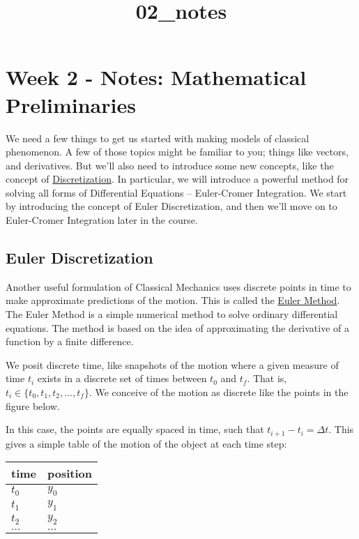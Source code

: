\documentclass[11pt]{article}
\title{02\_notes}
\begin{document}
    
    \maketitle
    
    

    
    \section{Week 2 - Notes: Mathematical
Preliminaries}\label{week-2---notes-mathematical-preliminaries}

We need a few things to get us started with making models of classical
phenomenon. A few of those topics might be familiar to you; things like
vectors, and derivatives. But we'll also need to introduce some new
concepts, like the concept of
\href{https://en.wikipedia.org/wiki/Discretization}{Discretization}. In
particular, we will introduce a powerful method for solving all forms of
Differential Equations -- Euler-Cromer Integration. We start by
introducing the concept of Euler Discretization, and then we'll move on
to Euler-Cromer Integration later in the course.

    \subsection{Euler Discretization}\label{euler-discretization}

Another useful formulation of Classical Mechanics uses discrete points
in time to make approximate predictions of the motion. This is called
the \href{https://en.wikipedia.org/wiki/Euler_method}{Euler Method}. The
Euler Method is a simple numerical method to solve ordinary differential
equations. The method is based on the idea of approximating the
derivative of a function by a finite difference.

We posit discrete time, like snapshots of the motion where a given
measure of time \(t_i\) exists in a discrete set of times between
\(t_0\) and \(t_f\). That is,
\(t_i \in \{t_0, t_1, t_2, \ldots, t_f\}\). We conceive of the motion as
discrete like the points in the figure below.

In this case, the points are equally spaced in time, such that
\(t_{i+1} - t_i = \Delta t\). This gives a simple table of the motion of
the object at each time step:

\begin{longtable}[]{@{}ll@{}}
\toprule\noalign{}
time & position \\
\midrule\noalign{}
\endhead
\bottomrule\noalign{}
\endlastfoot
\(t_0\) & \(y_0\) \\
\(t_1\) & \(y_1\) \\
\(t_2\) & \(y_2\) \\
\(\ldots\) & \(\ldots\) \\
\end{longtable}
\end{document}
